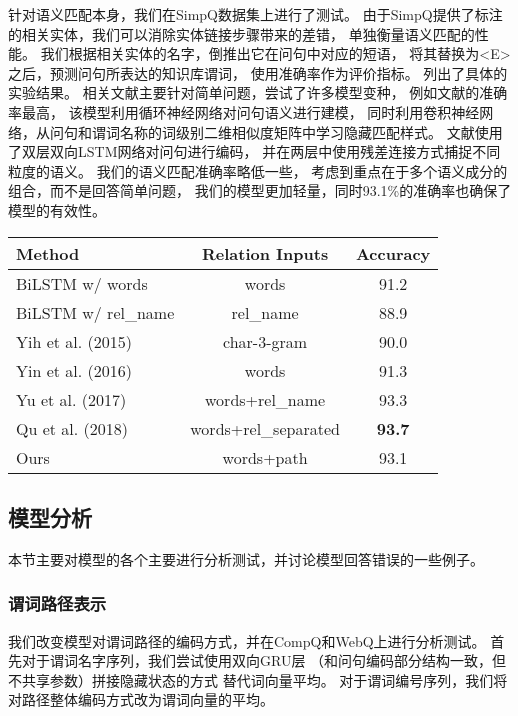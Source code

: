 针对语义匹配本身，我们在SimpQ数据集上进行了测试。
由于SimpQ提供了标注的相关实体，我们可以消除实体链接步骤带来的差错，
单独衡量语义匹配的性能。
我们根据相关实体的名字，倒推出它在问句中对应的短语，
将其替换为\textless E\textgreater 之后，预测问句所表达的知识库谓词，
使用准确率作为评价指标。
列出了具体的实验结果。
相关文献主要针对简单问题，尝试了许多模型变种，
例如文献\parencite{qu2018question}的准确率最高，
该模型利用循环神经网络对问句语义进行建模，
同时利用卷积神经网络，从问句和谓词名称的词级别二维相似度矩阵中学习隐藏匹配样式。
文献\parencite{yu2017improved}使用了双层双向LSTM网络对问句进行编码，
并在两层中使用残差连接方式捕捉不同粒度的语义。
我们的语义匹配准确率略低一些，
考虑到重点在于多个语义成分的组合，而不是回答简单问题，
我们的模型更加轻量，同时93.1\%的准确率也确保了模型的有效性。

\begin{table}[ht]
    \centering
    \begin{tabular} {l|c|c}
        \hline
        Method  &   Relation Inputs     & Accuracy   \\
        \hline
        BiLSTM w/ words             & words         & 91.2 \\
        BiLSTM w/ rel\_name         & rel\_name     & 88.9 \\
        Yih et al. (2015) \parencite{yih2015semantic}     & char-3-gram   & 90.0 \\
        Yin et al. (2016) \parencite{yin2016simple}       & words         & 91.3 \\
        Yu et al.  (2017) \parencite{yu2017improved}      & words+rel\_name    & 93.3 \\
        Qu et al.  (2018) \parencite{qu2018question}      & words+rel\_separated    & \textbf{93.7} \\
        \hline
        Ours                        & words+path    & 93.1 \\
        \hline
    \end{tabular}
    \label{tab:compqa-simpq}
\end{table}

\subsection{模型分析}%

本节主要对模型的各个主要进行分析测试，并讨论模型回答错误的一些例子。


\subsubsection{谓词路径表示}
我们改变模型对谓词路径的编码方式，并在CompQ和WebQ上进行分析测试。
首先对于谓词名字序列，我们尝试使用双向GRU层
（和问句编码部分结构一致，但不共享参数）拼接隐藏状态的方式
替代词向量平均。
对于谓词编号序列，我们将对路径整体编码方式改为谓词向量的平均。

